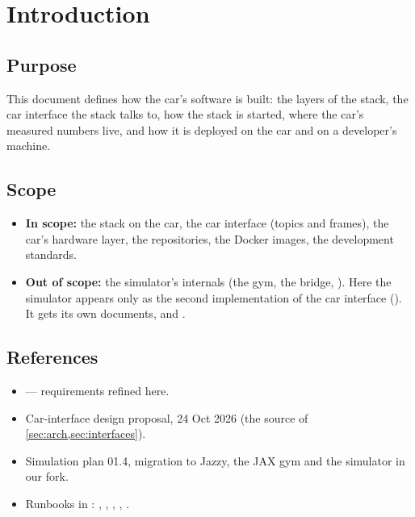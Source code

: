 \documentclass[11pt,a4paper]{article}
\begin{document}

\section{Introduction}
\subsection{Purpose}
This document defines how the car's software is built: the layers of the stack, the car interface the stack talks to, how the stack is started, where the car's measured numbers live, and how it is deployed on the car and on a developer's machine.

\subsection{Scope}
\begin{itemize}
  \item \textbf{In scope:} the stack on the car, the car interface (topics and frames), the car's hardware layer, the repositories, the Docker images, the development standards.
  \item \textbf{Out of scope:} the simulator's internals (the gym, the bridge, ). Here the simulator appears only as the second implementation of the car interface (). It gets its own documents,  and  \tbd.
\end{itemize}

\subsection{References}
\begin{itemize}
  \item {} --- requirements refined here.
  \item Car-interface design proposal, 24 Oct 2026 (the source of \cref{sec:arch,sec:interfaces}).
  \item Simulation plan 01.4, migration to Jazzy, the JAX gym and the simulator in our fork.
  \item Runbooks in : , , , , .
\end{itemize}
\end{document}
